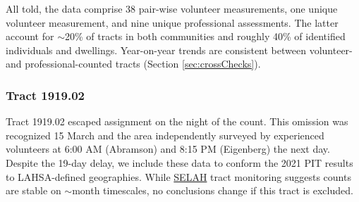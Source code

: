 \documentclass[11pt,twocolumn]{article}
\def\Count{count}
\begin{document}
All told, the data comprise 38 pair-wise volunteer measurements, one unique volunteer measurement, 
and nine unique professional assessments. The latter account for $\sim$20\% of tracts in both communities 
and roughly 40\% of identified individuals and dwellings. Year-on-year trends are consistent between
volunteer- and professional-counted tracts (Section \ref{sec:crossChecks}). 

\subsubsection{Tract 1919.02}
\label{sec:191902}

Tract 1919.02 escaped assignment on the night of the \Count. This omission was recognized 15 March
and the area independently surveyed by experienced volunteers at 6:00 AM (Abramson) and 
8:15 PM (Eigenberg) the next day. Despite the 19-day delay, we include these data to conform the 
2021 PIT results to LAHSA-defined geographies. While \href{https://selahnhc.org}
{SELAH} tract monitoring suggests counts are stable on $\sim$month timescales, no conclusions
change if this tract is excluded.%
\end{document}
